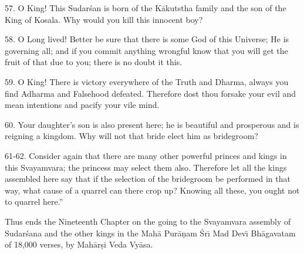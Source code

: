 57. O King! This Sudar\'san is born of the K\=akutstha family and the son of the King of Kosala. Why would you kill this innocent boy?

58. O Long lived! Better be sure that there is some God of this Universe; He is governing all; and if you commit anything wrongful know that you will get the fruit of that due to you; there is no doubt it
this.

59. O King! There is victory everywhere of the Truth and Dharma, always you find Adharma and Falsehood defeated. Therefore dost thou forsake your evil and mean intentions and pacify your vile mind.

60. Your daughter's son is also present here; he is beautiful and prosperous and is reigning a kingdom. Why will not that bride elect him as bridegroom?

61-62. Consider again that there are many other powerful princes and kings in this Svayamvara; the princess may select them also. Therefore let all the kings assembled here say that if the selection of the bridegroom be performed in that way, what cause of a quarrel can there crop up? Knowing all these, you ought not to quarrel here.''

Thus ends the Nineteenth Chapter on the going to the Svayamvara assembly of Sudar\'sana and the other kings in the Mah\=a Pur\=a\d{n}am \'Sr\={\i} Mad Dev\={\i} Bh\=agavatam of 18,000 verses, by Mah\=ar\d{s}i Veda Vy\=asa.



